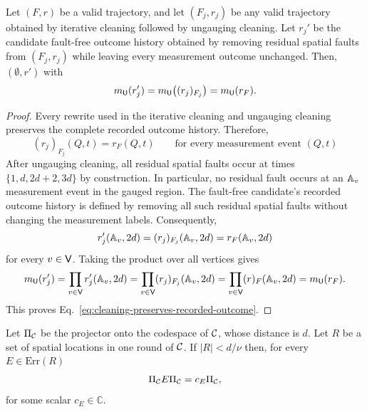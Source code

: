 \documentclass[11pt]{article}
\begin{document}
\begin{lemma}
\label{lem:logical-success-condition-1}
    Let $(F,r)$ be a valid trajectory, and let $(F_j,r_j)$ be any valid trajectory obtained by iterative cleaning followed by ungauging cleaning.
    Let $r_j'$ be the candidate fault-free outcome history obtained by removing residual spatial faults from $(F_j,r_j)$ while leaving every measurement outcome unchanged. Then,
    $(\emptyset,r')$ with
    \begin{equation}
        m_{\mathsf{U}}(r'_j)=m_{\mathsf{U}}\bigl((r_j)_{F_j}\bigr) = m_{\mathsf{U}} (r_F).
        \label{eq:cleaning-preserves-recorded-outcome}
    \end{equation}
\end{lemma}
\begin{proof}
    Every rewrite used in the iterative cleaning and ungauging cleaning preserves the complete recorded outcome history. Therefore,
    \[
    (r_j)_{F_j}(Q,t) = r_F(Q,t)\qquad \text{for every measurement event }(Q,t)
    \]
    After ungauging cleaning, all residual spatial faults occur at times $\{1,d,2d+2,3d\}$ by construction.
    In particular, no residual fault occurs at an $\mathbb{A}_v$ measurement event in the gauged region. 
    The fault-free candidate's recorded outcome history is defined by removing all such residual spatial faults without changing the measurement labels.
    Consequently,
    \[
    r_j'(\mathbb{A}_v,2d) = (r_j)_{F_j} (\mathbb{A}_v, 2d) = r_F (\mathbb{A}_v, 2d)
    \]
    for every $v\in \mathsf{V}$.
    Taking the product over all vertices gives
    \[
    m_{\mathsf{U}}(r'_j) = \prod_{v\in \mathsf{V}}r_j'(\mathbb{A}_v, 2d) = \prod_{v\in \mathsf{V}}(r_j)_{F_j}(\mathbb{A}_v,2d) = \prod_{v\in \mathsf{V}}(r)_{F}(\mathbb{A}_v,2d) = m_{\mathsf{U}} (r_F).
    \]
    This proves Eq.~\eqref{eq:cleaning-preserves-recorded-outcome}.
\end{proof}


\begin{lemma}
\label{lem:applying-space-distance}
Let $\Pi_{\mathcal{C}}$ be the projector onto the codespace of $\mathcal{C}$, whose distance is $d$.
Let $R$ be a set of spatial locations in one round of $\mathcal{C}$.
If $|R|<d/\nu$ then, for every $E\in \mathrm{Err}(R)$
\[
\Pi_{\mathcal{C}} E \Pi_{\mathcal{C}} = c_E \Pi_{\mathcal{C}},
\]
for some scalar $c_E\in \mathbb{C}$.
\end{lemma}
\end{document}
